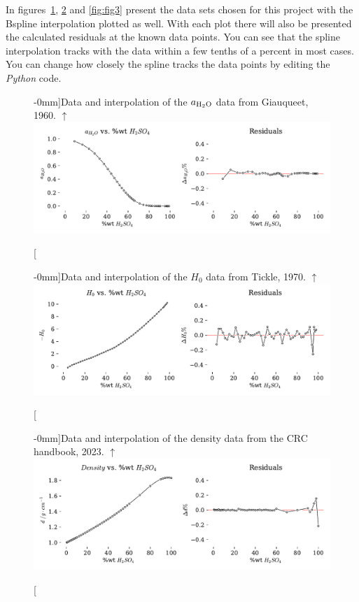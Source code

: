 \documentclass[]{tufte-handout}
\begin{document}
In figures~\ref{fig:fig1}, \ref{fig:fig2} and \vref{fig:fig3} present the data sets chosen for this project with the Bspline interpolation plotted as well. With each plot there will also be presented the calculated residuals at the known data points.  You can see that the spline interpolation tracks with the data within a few tenths of a percent in most cases. You can change how closely the spline tracks the data points by editing the \textit{Python} code.


\begin{figure}[h!]
  \centering
  \caption[][-0mm]{Data and interpolation of the $a_{\ce{H2O}}$ data from Giauqueet, 1960. $\uparrow$} 
  \includegraphics[scale=0.7]{images/aH2O_interp}
  \label{fig:fig1}
\end{figure}

\begin{figure}[h!]
  \centering
  \caption[][-0mm]{Data and interpolation of the $H_0$ data from Tickle, 1970. $\uparrow$} 
  \includegraphics[scale=0.7]{images/H0_interp}
  \label{fig:fig2}
\end{figure}


\begin{figure}[h!]
  \centering
  \caption[][-0mm]{Data and interpolation of the density data from the CRC handbook, 2023. $\uparrow$} 
  \includegraphics[scale=0.7]{images/Density_interp}
  \label{fig:fig3}
\end{figure}
\end{document}
